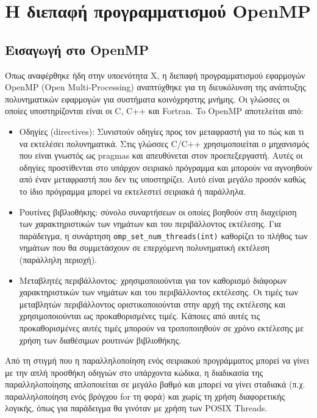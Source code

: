 \chapter{Η διεπαφή προγραμματισμού OpenMP}
\label{ch:OpenMP API}

\section{Εισαγωγή στο OpenMP}
\label{sec:Introduction to OpenMP}
Όπως αναφέρθηκε ήδη στην υποενότητα Χ, η διεπαφή προγραμματισμού εφαρμογών OpenMP (Open Multi-Processing) αναπτύχθηκε για τη διευκόλυνση της ανάπτυξης πολυνηματικών εφαρμογών για συστήματα κοινόχρηστης μνήμης. Οι γλώσσες οι οποίες υποστηρίζονται είναι οι C, C++ και Fortran.
To OpenMP αποτελείται από:
\begin{itemize}
	\item Oδηγίες (directives): Συνιστούν οδηγίες προς τον μεταφραστή για το πώς και τι να εκτελέσει πολυνηματικά. Στις γλώσσες C/C++ χρησιμοποιείται ο μηχανισμός που είναι γνωστός ως pragmas και απευθύνεται στον προεπεξεργαστή. Αυτές οι οδηγίες προστίθενται στο υπάρχον σειριακό πρόγραμμα και μπορούν να αγνοηθούν από έναν μεταφραστή που δεν τις υποστηρίζει. Αυτό είναι μεγάλο προσόν καθώς το ίδιο πρόγραμμα μπορεί να εκτελεστεί σειριακά ή παράλληλα.
	\item Ρουτίνες βιβλιοθήκης: σύνολο συναρτήσεων οι οποίες βοηθούν στη διαχείριση των χαρακτηριστικών των νημάτων και του περιβάλλοντος εκτέλεσης. Για παράδειγμα, η συνάρτηση \texttt{omp\_set\_num\_threads(int)} καθορίζει το πλήθος των νημάτων που θα συμμετάσχουν σε επερχόμενη πολυνηματική εκτέλεση (παράλληλη περιοχή).
	\item Μεταβλητές περιβάλλοντος: χρησιμοποιούνται για τον καθορισμό διάφορων χαρακτηριστικών των νημάτων και του περιβάλλοντος εκτέλεσης. Οι τιμές των μεταβλητών περιβάλλοντος οριστικοποιούνται στην αρχή της εκτέλεσης και χρησιμοποιούνται ως προκαθορισμένες τιμές. Κάποιες από αυτές τις προκαθορισμένες αυτές τιμές μπορούν να τροποποιηθούν σε χρόνο εκτέλεσης με χρήση των διαθέσιμων ρουτινών βιβλιοθήκης.
\end{itemize}

Από τη στιγμή που η παραλληλοποίηση ενός σειριακού προγράμματος μπορεί να γίνει με την απλή προσθήκη οδηγιών στο υπάρχοντα κώδικα, η διαδικασία της παραλληλοποίησης απλοποιείται σε μεγάλο βαθμό και μπορεί να γίνει σταδιακά (π.χ. παραλληλοποίηση ενός βρόγχου for τη φορά) και χωρίς τη χρήση διαφορετικής λογικής, όπως για παράδειγμα θα γινόταν με χρήση των POSIX Threads. 

